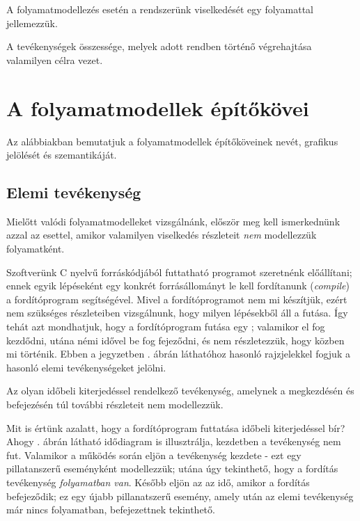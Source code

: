 A folyamatmodellezés esetén a rendszerünk viselkedését egy folyamattal jellemezzük.

\begin{definicio}
	A  tevékenységek összessége, melyek adott rendben történő végrehajtása valamilyen célra vezet.
\end{definicio}

\section{A folyamatmodellek építőkövei}

Az alábbiakban bemutatjuk a folyamatmodellek építőköveinek nevét, grafikus jelölését és szemantikáját.


\subsection{Elemi tevékenység}

Mielőtt valódi folyamatmodelleket vizsgálnánk, először meg kell ismerkednünk azzal az esettel, amikor valamilyen viselkedés részleteit \emph{nem} modellezzük folyamatként. 

\begin{pelda}
Szoftverünk C nyelvű forráskódjából futtatható programot szeretnénk előállítani; ennek egyik lépéseként egy konkrét forrásállományt le kell fordítanunk (\emph{compile}) a fordítóprogram segítségével. Mivel a fordítóprogramot nem mi készítjük, ezért nem szükséges részleteiben vizsgálnunk, hogy milyen lépésekből áll a futása. Így tehát azt mondhatjuk, hogy a fordítóprogram futása egy ; valamikor el fog kezdődni, utána némi idővel be fog fejeződni, és nem részletezzük, hogy közben mi történik. Ebben a jegyzetben . ábrán láthatóhoz hasonló rajzjelekkel fogjuk a hasonló elemi tevékenységeket jelölni. 
\end{pelda}

\begin{definicio}
	Az  olyan időbeli kiterjedéssel rendelkező tevékenység, amelynek a megkezdésén és befejezésén túl további részleteit nem modellezzük. 
\end{definicio}


\begin{pelda}
Mit is értünk azalatt, hogy a fordítóprogram futtatása időbeli kiterjedéssel bír? Ahogy . ábrán látható idődiagram is illusztrálja, kezdetben a tevékenység nem fut. Valamikor a működés során eljön a tevékenység kezdete - ezt egy pillatanszerű eseményként modellezzük; utána úgy tekinthető, hogy a fordítás tevékenység \emph{folyamatban van}. Később eljön az az idő, amikor a fordítás befejeződik; ez egy újabb pillanatszerű esemény, amely után az elemi tevékenység már nincs folyamatban, befejezettnek tekinthető.    
\end{pelda}

